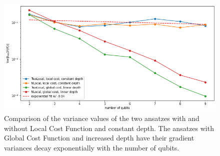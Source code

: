 \begin{figure}
    \includegraphics[width=\textwidth]{Artefact/Appendices/variancesLCF.png}
    \caption{
        Comparison of the variance values of the two ansatzes with and without Local Cost Function and constant depth.
        The ansatzes with Global Cost Function and increased depth have their gradient variances decay exponentially with the number of qubits. 
    }
    \label{Plot variance default and Local Cost}
\end{figure}
